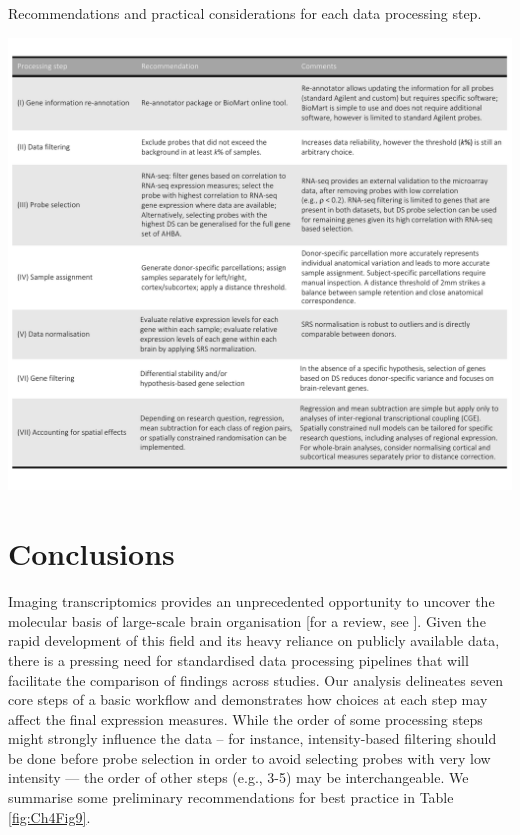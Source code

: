 \begin{table}[H]
\caption{Recommendations and practical considerations for each data processing step.}
  \centering
    \includegraphics[width=1\textwidth]{Chapter4/Ch4Fig9.pdf}
\label{fig:Ch4Fig9}
\end{table}

\section{Conclusions}

Imaging transcriptomics provides an unprecedented opportunity to uncover the molecular basis of large-scale brain organisation [for a review, see \citep{Fornito2019}]. Given the rapid development of this field and its heavy reliance on publicly available data, there is a pressing need for standardised data processing pipelines that will facilitate the comparison of findings across studies. Our analysis delineates seven core steps of a basic workflow and demonstrates how choices at each step may affect the final expression measures. While the order of some processing steps might strongly influence the data -- for instance, intensity-based filtering should be done before probe selection in order to avoid selecting probes with very low intensity — the order of other steps (e.g., 3-5) may be interchangeable. We summarise some preliminary recommendations for best practice in Table \ref{fig:Ch4Fig9}.

